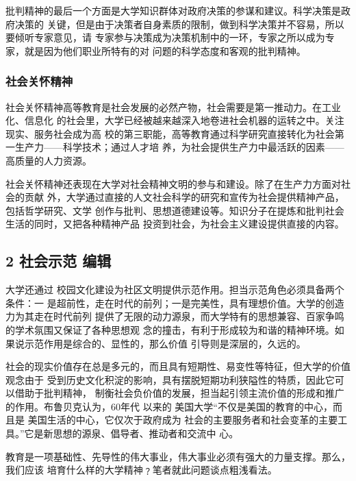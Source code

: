 \documentclass[11pt]{ctexart}
\begin{document}
{{{{批判精神的最后一个方面是大学知识群体对政府决策的参谋和建议。科学决策是政府决策的
关键，但是由于决策者自身素质的限制，做到科学决策并不容易，所以要倾听专家意见，请
专家参与决策成为决策机制中的一环，专家之所以成为专家，就是因为他们职业所特有的对
问题的科学态度和客观的批判精神。


\subsubsection{社会关怀精神}
\label{sec:org1c20f99}

社会关怀精神高等教育是社会发展的必然产物，社会需要是第一推动力。在工业化、信息化
的社会里，大学已经被越来越深入地卷进社会机器的运转之中。关注现实、服务社会成为高
校的第三职能，高等教育通过科学研究直接转化为社会第一生产力——科学技术；通过人才培
养，为社会提供生产力中最活跃的因素——高质量的人力资源。


社会关怀精神还表现在大学对社会精神文明的参与和建设。除了在生产力方面对社会的贡献
外，大学通过直接的人文社会科学的研究和宣传为社会提供精神产品，包括哲学研究、文学
创作与批判、思想道德建设等。知识分子在提炼和批判社会生活的同时，又把各种精神产品
投资到社会，为社会主义建设提供直接的内容。


\subsection{2 社会示范 编辑}
\label{sec:org4507dde}
大学还通过 校园文化建设为社区文明提供示范作用。担当示范角色必须具备两个条件：一
是超前性，走在时代的前列；一是完美性，具有理想价值。大学的创造力为其走在时代前列
提供了无限的动力源泉，而大学特有的思想兼容、百家争鸣的学术氛围又保证了各种思想观
念的撞击，有利于形成较为和谐的精神环境。如果说示范作用是综合的、显性的，那么价值
引导则是深层的，久远的。

社会的现实价值存在总是多元的，而且具有短期性、易变性等特征，但大学的价值观念由于
受到历史文化积淀的影响，具有摆脱短期功利狭隘性的特质，因此它可以借助于批判精神，
制衡社会负价值的发展，担当起引领主流价值的形成和推广的作用。布鲁贝克认为，60年代
以来的 美国大学“不仅是美国的教育的中心，而且是 美国生活的中心，它仅次于政府成为
社会的主要服务者和社会变革的主要工具。”它是新思想的源泉、倡导者、推动者和交流中
心。


教育是一项基础性、先导性的伟大事业，伟大事业必须有强大的力量支撑。那么，我们应该
培育什么样的大学精神﹖笔者就此问题谈点粗浅看法。


}}}}
\end{document}
